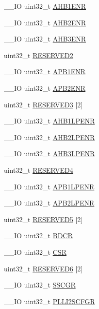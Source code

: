 \begin{DoxyCompactItemize}
\item 
\-\_\-\-\_\-\-I\-O uint32\-\_\-t \hyperlink{struct_r_c_c___type_def_a1e9c75b06c99d0611535f38c7b4aa845}{A\-H\-B1\-E\-N\-R}
\item 
\-\_\-\-\_\-\-I\-O uint32\-\_\-t \hyperlink{struct_r_c_c___type_def_a5e92ed32c33c92e7ebf6919400ad535b}{A\-H\-B2\-E\-N\-R}
\item 
\-\_\-\-\_\-\-I\-O uint32\-\_\-t \hyperlink{struct_r_c_c___type_def_acdaa650fcd63730825479f6e8f70d4c0}{A\-H\-B3\-E\-N\-R}
\item 
uint32\-\_\-t \hyperlink{struct_r_c_c___type_def_a4c9b972a304c0e08ca27cbe57627c496}{R\-E\-S\-E\-R\-V\-E\-D2}
\item 
\-\_\-\-\_\-\-I\-O uint32\-\_\-t \hyperlink{struct_r_c_c___type_def_ac88901e2eb35079b7b58a185e6bf554c}{A\-P\-B1\-E\-N\-R}
\item 
\-\_\-\-\_\-\-I\-O uint32\-\_\-t \hyperlink{struct_r_c_c___type_def_acc7bb47dddd2d94de124f74886d919be}{A\-P\-B2\-E\-N\-R}
\item 
uint32\-\_\-t \hyperlink{struct_r_c_c___type_def_ab6f0f833dbe064708de75d95c68c32fd}{R\-E\-S\-E\-R\-V\-E\-D3} \mbox{[}2\mbox{]}
\item 
\-\_\-\-\_\-\-I\-O uint32\-\_\-t \hyperlink{struct_r_c_c___type_def_aae70b1922167eb58d564cb82d39fd10b}{A\-H\-B1\-L\-P\-E\-N\-R}
\item 
\-\_\-\-\_\-\-I\-O uint32\-\_\-t \hyperlink{struct_r_c_c___type_def_a2b30982547fae7d545d260312771b5c9}{A\-H\-B2\-L\-P\-E\-N\-R}
\item 
\-\_\-\-\_\-\-I\-O uint32\-\_\-t \hyperlink{struct_r_c_c___type_def_a2ff82b9bf0231645108965aa0febd766}{A\-H\-B3\-L\-P\-E\-N\-R}
\item 
uint32\-\_\-t \hyperlink{struct_r_c_c___type_def_ac0018930ee9f18afda25b695b9a4ec16}{R\-E\-S\-E\-R\-V\-E\-D4}
\item 
\-\_\-\-\_\-\-I\-O uint32\-\_\-t \hyperlink{struct_r_c_c___type_def_ad85a9951a7be79fe08ffc90f796f071b}{A\-P\-B1\-L\-P\-E\-N\-R}
\item 
\-\_\-\-\_\-\-I\-O uint32\-\_\-t \hyperlink{struct_r_c_c___type_def_aba51c57f9506e14a6f5983526c78943b}{A\-P\-B2\-L\-P\-E\-N\-R}
\item 
uint32\-\_\-t \hyperlink{struct_r_c_c___type_def_ac0eb05794aeee3b4ed69c8fe54c9be3b}{R\-E\-S\-E\-R\-V\-E\-D5} \mbox{[}2\mbox{]}
\item 
\-\_\-\-\_\-\-I\-O uint32\-\_\-t \hyperlink{struct_r_c_c___type_def_a0b9a3ced775287c8585a6a61af4b40e9}{B\-D\-C\-R}
\item 
\-\_\-\-\_\-\-I\-O uint32\-\_\-t \hyperlink{struct_r_c_c___type_def_a876dd0a8546697065f406b7543e27af2}{C\-S\-R}
\item 
uint32\-\_\-t \hyperlink{struct_r_c_c___type_def_a10da398d74a1f88d5b42bd40718d9447}{R\-E\-S\-E\-R\-V\-E\-D6} \mbox{[}2\mbox{]}
\item 
\-\_\-\-\_\-\-I\-O uint32\-\_\-t \hyperlink{struct_r_c_c___type_def_aaef3da59eaf7c6dfdf9a12fd60ce58a8}{S\-S\-C\-G\-R}
\item 
\-\_\-\-\_\-\-I\-O uint32\-\_\-t \hyperlink{struct_r_c_c___type_def_a2d08d5f995ed77228eb56741184a1bb6}{P\-L\-L\-I2\-S\-C\-F\-G\-R}
\end{DoxyCompactItemize}


